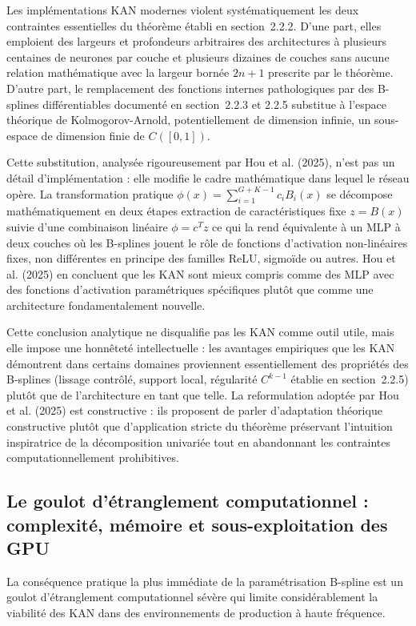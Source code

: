 \documentclass[11pt,a4paper,oneside]{report}
\theoremstyle{definition}
\theoremstyle{remark}
\begin{document}
Les implémentations KAN modernes violent systématiquement les deux contraintes essentielles du théorème établi en section~2.2.2. D'une part, elles emploient des largeurs et profondeurs arbitraires  des architectures à plusieurs centaines de neurones par couche et plusieurs dizaines de couches  sans aucune relation mathématique avec la largeur bornée $2n+1$ prescrite par le théorème. D'autre part, le remplacement des fonctions internes pathologiques par des B-splines différentiables  documenté en section~2.2.3 et 2.2.5  substitue à l'espace théorique de Kolmogorov-Arnold, potentiellement de dimension infinie, un sous-espace de dimension finie de $C([0,1])$.

Cette substitution, analysée rigoureusement par Hou et al. (2025), n'est pas un détail d'implémentation : elle modifie le cadre mathématique dans lequel le réseau opère. La transformation pratique $\phi(x) = \sum_{i=1}^{G+K-1} c_i B_i(x)$ se décompose mathématiquement en deux étapes  extraction de caractéristiques fixe $z = B(x)$ suivie d'une combinaison linéaire $\phi = c^T z$  ce qui la rend équivalente à un MLP à deux couches où les B-splines jouent le rôle de fonctions d'activation non-linéaires fixes, non différentes en principe des familles ReLU, sigmoïde ou autres. Hou et al. (2025) en concluent que les KAN sont mieux compris comme des MLP avec des fonctions d'activation paramétriques spécifiques plutôt que comme une architecture fondamentalement nouvelle.

Cette conclusion analytique ne disqualifie pas les KAN comme outil utile, mais elle impose une honnêteté intellectuelle : les avantages empiriques que les KAN démontrent dans certains domaines proviennent essentiellement des propriétés des B-splines (lissage contrôlé, support local, régularité $C^{k-1}$ établie en section~2.2.5) plutôt que de l'architecture en tant que telle. La reformulation adoptée par Hou et al. (2025) est constructive : ils proposent de parler d'adaptation théorique constructive plutôt que d'application stricte du théorème  préservant l'intuition inspiratrice de la décomposition univariée tout en abandonnant les contraintes computationnellement prohibitives.

\subsection{Le goulot d'étranglement computationnel : complexité, mémoire et sous-exploitation des GPU}

La conséquence pratique la plus immédiate de la paramétrisation B-spline est un goulot d'étranglement computationnel sévère qui limite considérablement la viabilité des KAN dans des environnements de production à haute fréquence.
\end{document}
